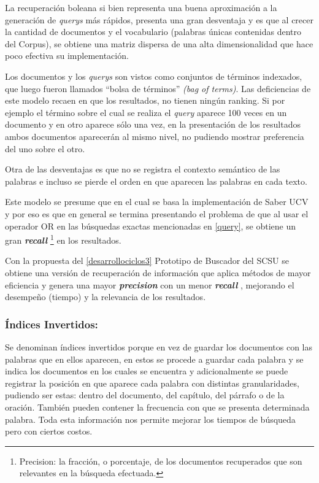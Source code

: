 \documentclass[
  10,
  openany]{book}
\begin{document}
La recuperación boleana si bien representa una buena aproximación a la generación de \emph{querys} más rápidos, presenta una gran desventaja y es que al crecer la cantidad de documentos y el vocabulario (palabras únicas contenidas dentro del Corpus), se obtiene una matriz dispersa de una alta dimensionalidad que hace poco efectiva su implementación.

Los documentos y los \emph{querys} son vistos como conjuntos de términos indexados, que luego fueron llamados ``bolsa de términos'' \emph{(bag of terms)}. Las deficiencias de este modelo recaen en que los resultados, no tienen ningún ranking. Si por ejemplo el término sobre el cual se realiza el \emph{query} aparece 100 veces en un documento y en otro aparece sólo una vez, en la presentación de los resultados ambos documentos aparecerán al mismo nivel, no pudiendo mostrar preferencia del uno sobre el otro.

Otra de las desventajas es que no se registra el contexto semántico de las palabras e incluso se pierde el orden en que aparecen las palabras en cada texto.

Este modelo se presume que en el cual se basa la implementación de Saber UCV y por eso es que en general se termina presentando el problema de que al usar el operador OR en las búsquedas exactas mencionadas en \ref{query}, se obtiene un gran \textbf{\emph{recall}} \footnote{Precision: la fracción, o porcentaje, de los documentos recuperados que son relevantes en la búsqueda efectuada.} en los resultados.

Con la propuesta del \ref{desarrollociclos3} Prototipo de Buscador del SCSU se obtiene una versión de recuperación de información que aplica métodos de mayor eficiencia y genera una mayor \textbf{\emph{precision}} con un menor \textbf{\emph{recall}} , mejorando el desempeño (tiempo) y la relevancia de los resultados.

\hypertarget{invind}{%
\subsubsection{Índices Invertidos:}\label{invind}}

Se denominan índices invertidos porque en vez de guardar los documentos con las palabras que en ellos aparecen, en estos se procede a guardar cada palabra y se indica los documentos en los cuales se encuentra y adicionalmente se puede registrar la posición en que aparece cada palabra con distintas granularidades, pudiendo ser estas: dentro del documento, del capítulo, del párrafo o de la oración. También pueden contener la frecuencia con que se presenta determinada palabra. Toda esta información nos permite mejorar los tiempos de búsqueda pero con ciertos costos.
\end{document}
